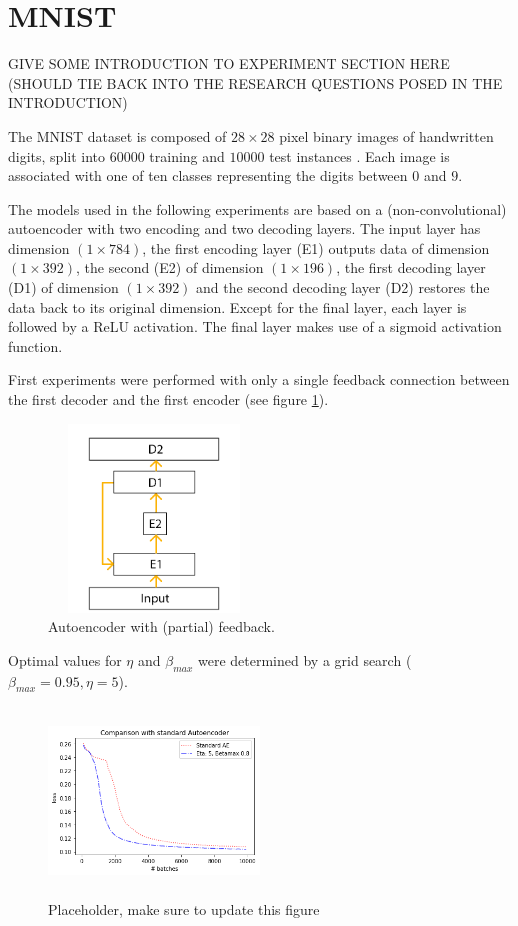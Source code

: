 \documentclass{article}
\begin{document}
\section{MNIST}
\label{mnist}
GIVE SOME INTRODUCTION TO EXPERIMENT SECTION HERE (SHOULD TIE BACK INTO THE RESEARCH QUESTIONS POSED IN THE INTRODUCTION)

The MNIST dataset is composed of $28 \times 28$ pixel binary images of handwritten digits, split into $60000$ training and $10000$ test instances \cite{lecun2010mnist}. Each image is associated with one of ten classes representing the digits between $0$ and $9$. 

The models used in the following experiments are based on a (non-convolutional) autoencoder with two encoding and two decoding layers. The input layer has dimension $(1\times784)$, the first encoding layer (E1) outputs data of dimension $(1\times392)$, the second (E2) of dimension $(1\times196)$, the first decoding layer (D1) of dimension $(1\times392)$ and the second decoding layer (D2) restores the data back to its original dimension. Except for the final layer, each layer is followed by a ReLU activation. The final layer makes use of a sigmoid activation function. 

First experiments were performed with only a single feedback connection between the first decoder and the first encoder (see figure \ref{fig:autoenc}). 

\begin{figure}
      \centering
      \includegraphics[width=0.5\textwidth,height=5cm,keepaspectratio]{img/AutoEnc.png}
      \caption{Autoencoder with (partial) feedback.}
      \label{fig:autoenc}
  \end{figure}
  
Optimal values for $\eta$ and $\beta_{max}$ were determined by a grid search ($\beta_{max}=0.95, \eta=5$).
 \begin{figure}
      \centering
      \includegraphics[width=0.5\textwidth,height=5cm,keepaspectratio]{img/fb_vs_nofb.png}
      \caption{Placeholder, make sure to update this figure}
      \label{fig:fbvsnofb}
  \end{figure}
  
\end{document}
